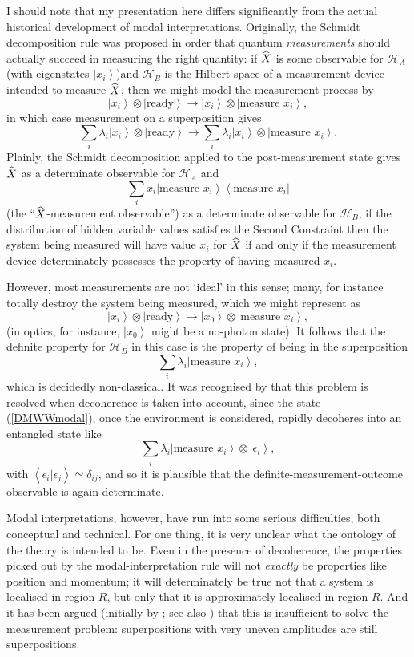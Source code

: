\documentclass[12pt]{article}
\newcommand{\be}{\begin{equation}}
\newcommand{\ee}{\end{equation}}
\newcommand{\mc}[1]{\ensuremath{\mathcal{#1}}}
\newcommand{\ket}[1]{\ensuremath{\left|  #1 \right\rangle}}
\newcommand{\bra}[1]{\ensuremath{\left\langle #1 \right|}}
\newcommand{\bk}[2]{\ensuremath{\left\langle #1 | #2 \right\rangle}}
\newcommand{\proj}[2]{\ensuremath{\ket{#1} \bra{#2}}}
\newcommand{\tpk}[2]{\ensuremath{\ket{#1}\!\otimes\!\ket{#2}}}
\newcommand{\op}[1]{\ensuremath{\widehat{\textsf{\ensuremath{#1}}}}}
\begin{document}
I should note that my presentation here differs significantly from the actual historical development of modal interpretations. Originally,  the Schmidt decomposition rule was proposed in order that quantum \emph{measurements} should actually succeed in measuring the right quantity: if \op{X} is some observable for $\mc{H}_A$ (with eigenstates $\ket{x_i}$)and $\mc{H}_B$ is the Hilbert space of a measurement device intended to measure \op{X}, then we might model the measurement process by
\be \tpk{x_i}{\mathrm{\mbox{ready}}}\longrightarrow \tpk{x_i}{\mathrm{\mbox{measure }}x_i},
\ee
in which case measurement on a superposition gives
\be
\sum_i \lambda_i \ket{x_i} \otimes \ket{\mathrm{\mbox{ready}}}
\longrightarrow
\sum_i \lambda_i \tpk{x_i}{\mathrm{\mbox{measure }}x_i}.
\ee
Plainly, the Schmidt decomposition applied to the post-measurement state gives $\op{X}$ as a determinate observable for $\mc{H}_A$ and 
\be
\sum_i x_i \proj{\mathrm{\mbox{measure }}x_i}{\mathrm{\mbox{measure }}x_i}
\ee
(the ``\op{X}-measurement observable'') as a determinate observable for $\mc{H}_B$; if the distribution of hidden variable values satisfies the Second Constraint then the system being measured will have value $x_i$ for \op{X} if and only if the measurement device determinately possesses the property of having measured $x_i$. 

However, most measurements are not `ideal' in this sense; many, for instance  totally destroy the system being measured, which we might represent as
\be
\tpk{x_i}{\mathrm{\mbox{ready}}}\longrightarrow \tpk{x_0}{\mathrm{\mbox{measure }}x_i},
\ee
(in optics, for instance, \ket{x_0} might be a no-photon state). It follows that the definite property for $\mc{H}_B$ in this case is the property of being in the superposition 
\be\label{DMWWmodal}
\sum_i \lambda_i\ket{\mathrm{\mbox{measure }}x_i},
\ee
which is decidedly non-classical. It was recognised by  that this problem is resolved when decoherence is taken into account, since the state (\ref{DMWWmodal}), once the environment is considered, rapidly decoheres into an entangled state like
\be
\sum_i \lambda_i\tpk{\mathrm{\mbox{measure }}x_i}{\epsilon_i},
\ee
with $\bk{\epsilon_i}{\epsilon_j}\simeq \delta_{ij}$, and so it is plausible that the definite-measurement-outcome observable is again  determinate.

Modal interpretations, however, have run into some serious difficulties, both conceptual and technical.  For one thing, it is very unclear what the ontology of the theory is intended to be. Even in the presence of decoherence, the properties picked out by the modal-interpretation rule will not \emph{exactly} be properties like position and momentum; it will determinately be true not that a system is localised in region $R$, but only that it is approximately localised in region $R$. And it has been argued (initially by ; see also ) that this is insufficient to solve the measurement problem: superpositions with very uneven amplitudes are still superpositions.
\end{document}
